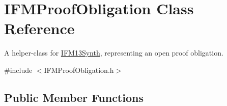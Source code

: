 \hypertarget{classIFMProofObligation}{\section{I\-F\-M\-Proof\-Obligation Class Reference}
\label{classIFMProofObligation}
}


A helper-\/class for \hyperlink{classIFM13Synth}{I\-F\-M13\-Synth}, representing an open proof obligation.  




{\ttfamily \#include $<$I\-F\-M\-Proof\-Obligation.\-h$>$}

\subsection*{Public Member Functions}
